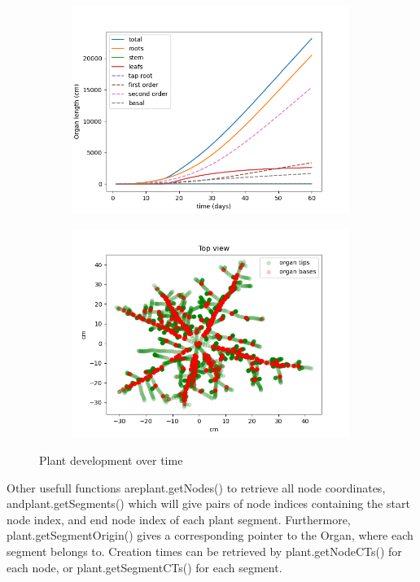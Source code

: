\begin{figure}
\begin{subfigure}[c]{0.5\textwidth}
\includegraphics[width=0.99\textwidth]{figures/topics_development.png}
 \label{fig:topics_development}
\end{subfigure} 
\begin{subfigure}[c]{0.5\textwidth}
\includegraphics[width=0.99\textwidth]{figures/topics_development2.png}
 \label{fig:topics_development2}
\end{subfigure}
\caption{Plant development over time} 
\end{figure}

Other usefull functions are{plant.getNodes()} to retrieve all node coordinates, and{plant.getSegments()} which will give pairs of node indices containing the start node index, and end node index of each plant segment. Furthermore, {plant.getSegmentOrigin()} gives a corresponding pointer to the Organ, where each segment belongs to. Creation times can be retrieved by {plant.getNodeCTs()} for each node, or {plant.getSegmentCTs()} for each segment.

